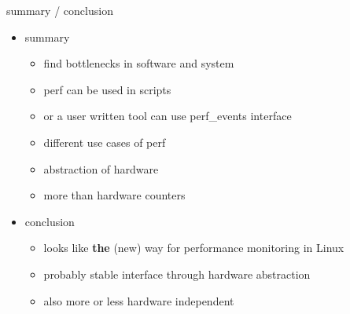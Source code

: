 
\begin{frame}{summary / conclusion}
\begin{itemize}
  \item summary
  \begin{itemize}
    \item find bottlenecks in software and system
    \item perf can be used in scripts
    \item or a user written tool can use perf\_events interface
    \item different use cases of perf
    \item abstraction of hardware
    \item more than hardware counters
  \end{itemize}
\pause
  \item conclusion
  \begin{itemize}
    \item looks like \textbf{the} (new) way for performance monitoring in Linux
    \item probably stable interface through hardware abstraction
    \item also more or less hardware independent
  \end{itemize}
\end{itemize}
\end{frame}



